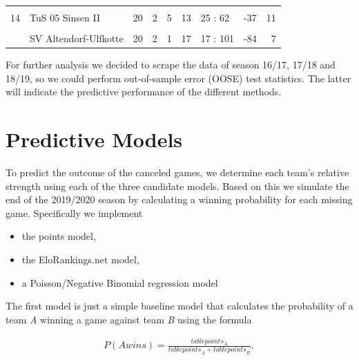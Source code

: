 \documentclass[12pt,a4paper]{article}
\begin{document}
\begin{table}[H]
{\begin{tabular}[t]{rllrrrlrr}
\cellcolor{gray!6}{13} & \cellcolor{gray!6}{SC Reken II} & \cellcolor{gray!6}{19} & \cellcolor{gray!6}{4} & \cellcolor{gray!6}{3} & \cellcolor{gray!6}{12} & \cellcolor{gray!6}{41 : 61} & \cellcolor{gray!6}{-20} & \cellcolor{gray!6}{15}\\
14 & TuS 05 Sinsen II & 20 & 2 & 5 & 13 & 25 : 62 & -37 & 11\\
\cellcolor{gray!6}{15} & \cellcolor{gray!6}{Adler Weseke II} & \cellcolor{gray!6}{20} & \cellcolor{gray!6}{2} & \cellcolor{gray!6}{4} & \cellcolor{gray!6}{14} & \cellcolor{gray!6}{23 : 64} & \cellcolor{gray!6}{-41} & \cellcolor{gray!6}{10}\\
\addlinespace
16 & SV Altendorf-Ulfkotte & 20 & 2 & 1 & 17 & 17 : 101 & -84 & 7\\
\bottomrule
\end{tabular}}
\end{table}

For further analysis we decided to scrape the data of season 16/17,
17/18 and 18/19, so we could perform out-of-sample error (OOSE) test
statistics. The latter will indicate the predictive performance of the
different methods.

\hypertarget{predictive-models}{%
\section{Predictive Models}\label{predictive-models}}

To predict the outcome of the canceled games, we determine each team's
relative strength using each of the three candidate models. Based on
this we simulate the end of the 2019/2020 season by calculating a
winning probability for each missing game. Specifically we implement

\begin{itemize}
\item the points model,
\item the EloRankings.net model, 
\item a Poisson/Negative Binomial regression model
\end{itemize}

The first model is just a simple baseline model that calculates the
probability of a team \emph{A} winning a game against team \emph{B}
using the formula

\begin{align}
P(A wins) = \frac{table points_A}{{table points}_A + {table points}_B},
\end{align}
\end{document}

